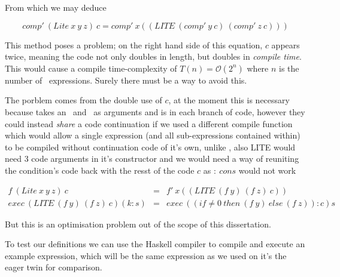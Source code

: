 \documentclass {article}
\begin{document}
From which we may deduce 

	\[ comp' \ (Lite \ x \ y \ z) \ c = comp' \ x ((LITE \ (comp' \ y \ c) \ (comp' \ z \ c))) \]

This method poses a problem;
on the right hand side of this equation,
$c$ appears twice, meaning the code not only 
doubles in length, but doubles in \emph{compile time}.
This would cause a compile time-complexity of
\( T(n) = \mathcal{O}(2^n) \)
where $n$ is the number of \lite\ expressions.
Surely there must be a way to avoid this.

The porblem comes from the double use of $c$,
at the moment this is necessary because \compp
takes an \expr\ and \code\ as arguments and is in
each branch of code,
however they could instead \emph{share}
a code continuation if we used a different compile function
which would allow a single expression 
(and all sub-expressions contained within)  
to be compiled without continuation code of it's own,
unlike \compp, also LITE would need 3 code arguments in
it's constructor and we would need a way of 
reuniting the condition's code back with the resst of the code $c$
as $: \ cons$ would not work

\begin{eqnarray*}
	f \ (Lite \ x \ y \ z) \ c &=& f' \ x ((LITE \ (f \ y) \ (f \ z) \ c)) \\
	exec \ (LITE \ (f \ y) \ (f \ z) \ c) (k : s) &=& exec \ ((if \not=0 \ then \ (f \ y) \ else \ (f \ z)) : c) s 
\end{eqnarray*}

But this is an optimisation problem out of the scope of this dissertation.


To test our definitions we can use the Haskell compiler
to compile and execute an example \lite expression,
which will be the same expression as we used
on it's the eager twin for comparison.
\end{document}
